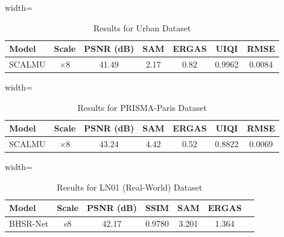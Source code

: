 \documentclass[conference]{IEEEtran}
\begin{document}
\begin{table}[htbp]
\caption{Results for Urban Dataset \cite{urban_dataset}}
\begin{center}
\begin{adjustbox}{width=\columnwidth}
\begin{tabular}{lcccccc}
\toprule
\textbf{Model} & \textbf{Scale} & \textbf{PSNR (dB)} & \textbf{SAM} & \textbf{ERGAS} & \textbf{UIQI} & \textbf{RMSE} \\
\midrule
SCALMU \cite{xu2026scalmu} & $\times 8$ & 41.49 & 2.17 & 0.82 & 0.9962 & 0.0084 \\
\bottomrule
\end{tabular}
\end{adjustbox}
\label{tab:urban}
\end{center}
\end{table}

\begin{table}[htbp]
\caption{Results for PRISMA-Paris Dataset \cite{prisma_dataset}}
\begin{center}
\begin{adjustbox}{width=\columnwidth}
\begin{tabular}{lcccccc}
\toprule
\textbf{Model} & \textbf{Scale} & \textbf{PSNR (dB)} & \textbf{SAM} & \textbf{ERGAS} & \textbf{UIQI} & \textbf{RMSE} \\
\midrule
SCALMU \cite{xu2026scalmu} & $\times 8$ & 43.24 & 4.42 & 0.52 & 0.8822 & 0.0069 \\
\bottomrule
\end{tabular}
\end{adjustbox}
\label{tab:prisma}
\end{center}
\end{table}

\begin{table}[htbp]
\caption{Results for LN01 (Real-World) Dataset \cite{ln01_dataset}}
\begin{center}
\begin{adjustbox}{width=\columnwidth}
\begin{tabular}{lcccccc}
\toprule
\textbf{Model} & \textbf{Scale} & \textbf{PSNR (dB)} & \textbf{SSIM} & \textbf{SAM} & \textbf{ERGAS} \\
\midrule
BHSR-Net \cite{dou2026bhsrnet} & s8 & 42.17 & 0.9780 & 3.201 & 1.364 \\
\bottomrule
\end{tabular}
\end{adjustbox}
\label{tab:ln01}
\end{center}
\end{table}
\end{document}
